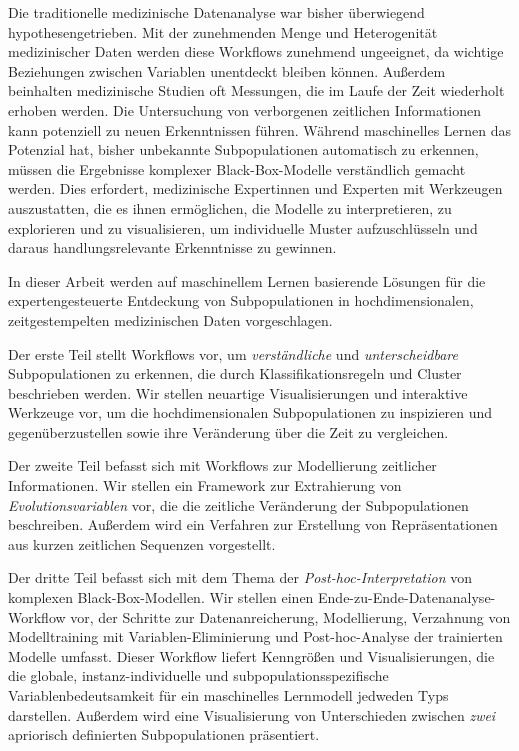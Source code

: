 \documentclass[
  oneside]{book}
\begin{document}
Die traditionelle medizinische Datenanalyse war bisher überwiegend hypothesengetrieben.
Mit der zunehmenden Menge und Heterogenität medizinischer Daten werden diese Workflows zunehmend ungeeignet, da wichtige Beziehungen zwischen Variablen unentdeckt bleiben können.
Außerdem beinhalten medizinische Studien oft Messungen, die im Laufe der Zeit wiederholt erhoben werden.
Die Untersuchung von verborgenen zeitlichen Informationen kann potenziell zu neuen Erkenntnissen führen.
Während maschinelles Lernen das Potenzial hat, bisher unbekannte Subpopulationen automatisch zu erkennen, müssen die Ergebnisse komplexer Black-Box-Modelle verständlich gemacht werden.
Dies erfordert, medizinische Expertinnen und Experten mit Werkzeugen auszustatten, die es ihnen ermöglichen, die Modelle zu interpretieren, zu explorieren und zu visualisieren, um individuelle Muster aufzuschlüsseln und daraus handlungsrelevante Erkenntnisse zu gewinnen.

In dieser Arbeit werden auf maschinellem Lernen basierende Lösungen für die expertengesteuerte Entdeckung von Subpopulationen in hochdimensionalen, zeitgestempelten medizinischen Daten vorgeschlagen.

Der erste Teil stellt Workflows vor, um \emph{verständliche} und \emph{unterscheidbare} Subpopulationen zu erkennen, die durch Klassifikationsregeln und Cluster beschrieben werden.
Wir stellen neuartige Visualisierungen und interaktive Werkzeuge vor, um die hochdimensionalen Subpopulationen zu inspizieren und gegenüberzustellen sowie ihre Veränderung über die Zeit zu vergleichen.

Der zweite Teil befasst sich mit Workflows zur Modellierung zeitlicher Informationen.
Wir stellen ein Framework zur Extrahierung von \emph{Evolutionsvariablen} vor, die die zeitliche Veränderung der Subpopulationen beschreiben.
Außerdem wird ein Verfahren zur Erstellung von Repräsentationen aus kurzen zeitlichen Sequenzen vorgestellt.

Der dritte Teil befasst sich mit dem Thema der \emph{Post-hoc-Interpretation} von komplexen Black-Box-Modellen.
Wir stellen einen Ende-zu-Ende-Datenanalyse-Workflow vor, der Schritte zur Datenanreicherung, Modellierung, Verzahnung von Modelltraining mit Variablen-Eliminierung und Post-hoc-Analyse der trainierten Modelle umfasst.
Dieser Workflow liefert Kenngrößen und Visualisierungen, die die globale, instanz-individuelle und subpopulationsspezifische Variablenbedeutsamkeit für ein maschinelles Lernmodell jedweden Typs darstellen.
Außerdem wird eine Visualisierung von Unterschieden zwischen \emph{zwei} apriorisch definierten Subpopulationen präsentiert.
\end{document}
